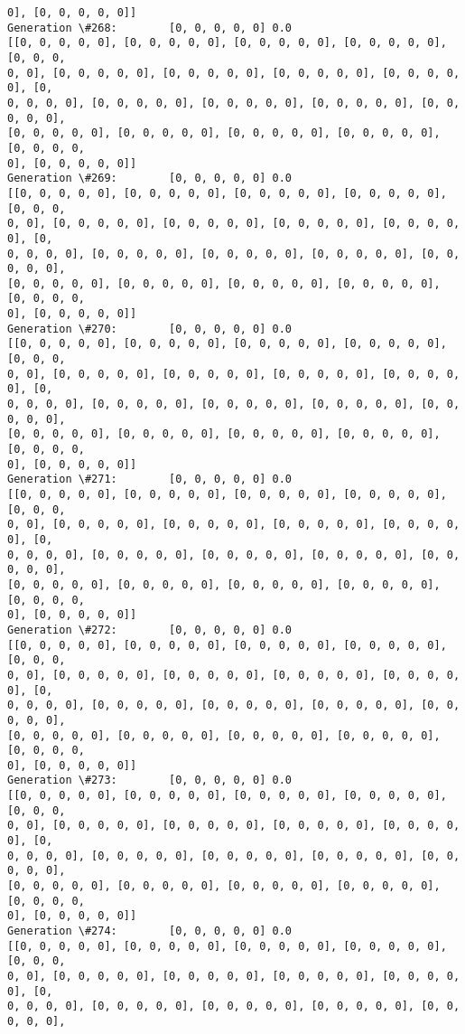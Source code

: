 \documentclass[11pt]{article}
\begin{document}
\begin{Verbatim}[commandchars=\\\{\}]
0], [0, 0, 0, 0, 0]]
Generation \#268:        [0, 0, 0, 0, 0] 0.0
[[0, 0, 0, 0, 0], [0, 0, 0, 0, 0], [0, 0, 0, 0, 0], [0, 0, 0, 0, 0], [0, 0, 0,
0, 0], [0, 0, 0, 0, 0], [0, 0, 0, 0, 0], [0, 0, 0, 0, 0], [0, 0, 0, 0, 0], [0,
0, 0, 0, 0], [0, 0, 0, 0, 0], [0, 0, 0, 0, 0], [0, 0, 0, 0, 0], [0, 0, 0, 0, 0],
[0, 0, 0, 0, 0], [0, 0, 0, 0, 0], [0, 0, 0, 0, 0], [0, 0, 0, 0, 0], [0, 0, 0, 0,
0], [0, 0, 0, 0, 0]]
Generation \#269:        [0, 0, 0, 0, 0] 0.0
[[0, 0, 0, 0, 0], [0, 0, 0, 0, 0], [0, 0, 0, 0, 0], [0, 0, 0, 0, 0], [0, 0, 0,
0, 0], [0, 0, 0, 0, 0], [0, 0, 0, 0, 0], [0, 0, 0, 0, 0], [0, 0, 0, 0, 0], [0,
0, 0, 0, 0], [0, 0, 0, 0, 0], [0, 0, 0, 0, 0], [0, 0, 0, 0, 0], [0, 0, 0, 0, 0],
[0, 0, 0, 0, 0], [0, 0, 0, 0, 0], [0, 0, 0, 0, 0], [0, 0, 0, 0, 0], [0, 0, 0, 0,
0], [0, 0, 0, 0, 0]]
Generation \#270:        [0, 0, 0, 0, 0] 0.0
[[0, 0, 0, 0, 0], [0, 0, 0, 0, 0], [0, 0, 0, 0, 0], [0, 0, 0, 0, 0], [0, 0, 0,
0, 0], [0, 0, 0, 0, 0], [0, 0, 0, 0, 0], [0, 0, 0, 0, 0], [0, 0, 0, 0, 0], [0,
0, 0, 0, 0], [0, 0, 0, 0, 0], [0, 0, 0, 0, 0], [0, 0, 0, 0, 0], [0, 0, 0, 0, 0],
[0, 0, 0, 0, 0], [0, 0, 0, 0, 0], [0, 0, 0, 0, 0], [0, 0, 0, 0, 0], [0, 0, 0, 0,
0], [0, 0, 0, 0, 0]]
Generation \#271:        [0, 0, 0, 0, 0] 0.0
[[0, 0, 0, 0, 0], [0, 0, 0, 0, 0], [0, 0, 0, 0, 0], [0, 0, 0, 0, 0], [0, 0, 0,
0, 0], [0, 0, 0, 0, 0], [0, 0, 0, 0, 0], [0, 0, 0, 0, 0], [0, 0, 0, 0, 0], [0,
0, 0, 0, 0], [0, 0, 0, 0, 0], [0, 0, 0, 0, 0], [0, 0, 0, 0, 0], [0, 0, 0, 0, 0],
[0, 0, 0, 0, 0], [0, 0, 0, 0, 0], [0, 0, 0, 0, 0], [0, 0, 0, 0, 0], [0, 0, 0, 0,
0], [0, 0, 0, 0, 0]]
Generation \#272:        [0, 0, 0, 0, 0] 0.0
[[0, 0, 0, 0, 0], [0, 0, 0, 0, 0], [0, 0, 0, 0, 0], [0, 0, 0, 0, 0], [0, 0, 0,
0, 0], [0, 0, 0, 0, 0], [0, 0, 0, 0, 0], [0, 0, 0, 0, 0], [0, 0, 0, 0, 0], [0,
0, 0, 0, 0], [0, 0, 0, 0, 0], [0, 0, 0, 0, 0], [0, 0, 0, 0, 0], [0, 0, 0, 0, 0],
[0, 0, 0, 0, 0], [0, 0, 0, 0, 0], [0, 0, 0, 0, 0], [0, 0, 0, 0, 0], [0, 0, 0, 0,
0], [0, 0, 0, 0, 0]]
Generation \#273:        [0, 0, 0, 0, 0] 0.0
[[0, 0, 0, 0, 0], [0, 0, 0, 0, 0], [0, 0, 0, 0, 0], [0, 0, 0, 0, 0], [0, 0, 0,
0, 0], [0, 0, 0, 0, 0], [0, 0, 0, 0, 0], [0, 0, 0, 0, 0], [0, 0, 0, 0, 0], [0,
0, 0, 0, 0], [0, 0, 0, 0, 0], [0, 0, 0, 0, 0], [0, 0, 0, 0, 0], [0, 0, 0, 0, 0],
[0, 0, 0, 0, 0], [0, 0, 0, 0, 0], [0, 0, 0, 0, 0], [0, 0, 0, 0, 0], [0, 0, 0, 0,
0], [0, 0, 0, 0, 0]]
Generation \#274:        [0, 0, 0, 0, 0] 0.0
[[0, 0, 0, 0, 0], [0, 0, 0, 0, 0], [0, 0, 0, 0, 0], [0, 0, 0, 0, 0], [0, 0, 0,
0, 0], [0, 0, 0, 0, 0], [0, 0, 0, 0, 0], [0, 0, 0, 0, 0], [0, 0, 0, 0, 0], [0,
0, 0, 0, 0], [0, 0, 0, 0, 0], [0, 0, 0, 0, 0], [0, 0, 0, 0, 0], [0, 0, 0, 0, 0],

\end{Verbatim}
\end{document}
